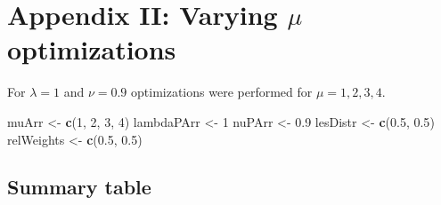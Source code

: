 \documentclass[
]{book}
\newenvironment{Shaded}{\begin{snugshade}}{\end{snugshade}}
\newcommand{\DecValTok}[1]{\textcolor[rgb]{0.00,0.00,0.81}{#1}}
\newcommand{\FloatTok}[1]{\textcolor[rgb]{0.00,0.00,0.81}{#1}}
\newcommand{\KeywordTok}[1]{\textcolor[rgb]{0.13,0.29,0.53}{\textbf{#1}}}
\newcommand{\NormalTok}[1]{#1}
\newcommand{\StringTok}[1]{\textcolor[rgb]{0.31,0.60,0.02}{#1}}
\begin{document}
\hypertarget{optim-op-point-vary-mu}{%
\section{\texorpdfstring{Appendix II: Varying \(\mu\) optimizations}{Appendix II: Varying \textbackslash mu optimizations}}\label{optim-op-point-vary-mu}}

For \(\lambda = 1\) and \(\nu = 0.9\) optimizations were performed for \(\mu = 1, 2, 3, 4\).

\begin{Shaded}
\begin{Highlighting}[]
\NormalTok{muArr <-}\StringTok{ }\KeywordTok{c}\NormalTok{(}\DecValTok{1}\NormalTok{, }\DecValTok{2}\NormalTok{, }\DecValTok{3}\NormalTok{, }\DecValTok{4}\NormalTok{)}
\NormalTok{lambdaPArr <-}\StringTok{ }\DecValTok{1}
\NormalTok{nuPArr <-}\StringTok{ }\FloatTok{0.9}
\NormalTok{lesDistr <-}\StringTok{ }\KeywordTok{c}\NormalTok{(}\FloatTok{0.5}\NormalTok{, }\FloatTok{0.5}\NormalTok{)}
\NormalTok{relWeights <-}\StringTok{ }\KeywordTok{c}\NormalTok{(}\FloatTok{0.5}\NormalTok{, }\FloatTok{0.5}\NormalTok{)}
\end{Highlighting}
\end{Shaded}

\hypertarget{summary-table-3}{%
\subsection{Summary table}\label{summary-table-3}}

\begin{table}[H]

\caption{\label{tab:optim-op-point-table-vary-mu}Summary of optimization results for 4 values of $\mu$, $\lambda = 1$, $\nu = 0.9$.}
\centering
{}
\end{table}
\end{document}
